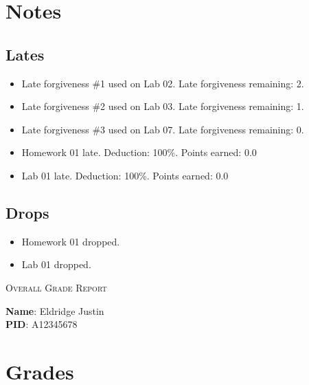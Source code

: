 \documentclass{article}
\begin{document}
\section*{Notes}


\subsection*{Lates}

\begin{itemize}


\item Late forgiveness \#1 used on Lab 02. Late forgiveness remaining: 2.


\item Late forgiveness \#2 used on Lab 03. Late forgiveness remaining: 1.


\item Late forgiveness \#3 used on Lab 07. Late forgiveness remaining: 0.


\item Homework 01 late. Deduction: 100\%. Points earned: 0.0


\item Lab 01 late. Deduction: 100\%. Points earned: 0.0


\end{itemize}


\subsection*{Drops}

\begin{itemize}


\item Homework 01 dropped.


\item Lab 01 dropped.


\end{itemize}
\newpage

\begin{center}
    \textsc{Overall Grade Report}
\end{center}
\vspace{4em}


\textbf{Name}: Eldridge Justin\\[2em]


\textbf{PID}: A12345678
\vspace{4em}

\section*{Grades}
\end{document}
